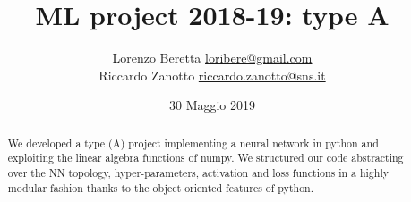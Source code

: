 \documentclass[12pt]{article}
\title{ML project 2018-19: type A}
\author{Lorenzo Beretta \href{mailto:loribere@gmail.com}{\url{loribere@gmail.com}}\\
   Riccardo Zanotto \href{mailto:riccardo.zanotto@sns.it}{\url{riccardo.zanotto@sns.it}}}
\date{30 Maggio 2019}
\begin{document}
\maketitle

\begin{abstract}
  We developed a type (A) project implementing a neural network in python and exploiting the linear algebra functions of numpy. We structured our code abstracting over the NN topology, hyper-parameters, activation and loss functions in a highly modular fashion thanks to the object oriented features of python.  
\end{abstract}






\end{document}
